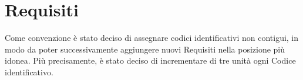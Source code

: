 \section{Requisiti}{
	Come convenzione è stato deciso di assegnare codici identificativi non contigui, in modo da poter successivamente aggiungere nuovi Requisiti nella posizione più idonea. Più precisamente, è stato deciso di incrementare di tre unità ogni Codice identificativo.\\
	
	\newpage
	
	\newpage
	
	\newpage
	
	\newpage
	
}